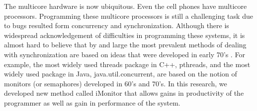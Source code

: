 \documentclass[preprint]{sigplanconf}
\begin{document}




The multicore hardware is now ubiquitous. Even the cell phones have
multicore processors. Programming these multicore processors is
still a challenging task due to
bugs resulted form concurrency and synchronization.
Although there is widespread acknowledgement of difficulties 
in programming these systems, it is almost hard to believe that 
by and large the most prevalent methods of dealing with synchronization are
based on ideas that were developed in early 70's \cite{hoa74, han75}. For 
example, the most widely used threads package in C++, pthreads, and
the most widely used package in Java, java.util.concurrent, are based
on the notion of monitors (or semaphores) developed in 60's and 70's.
In this research, we developed new method called iMonitor 
that allows gains in productivity of the programmer as well as gain in
performance of the system.
\end{document}
